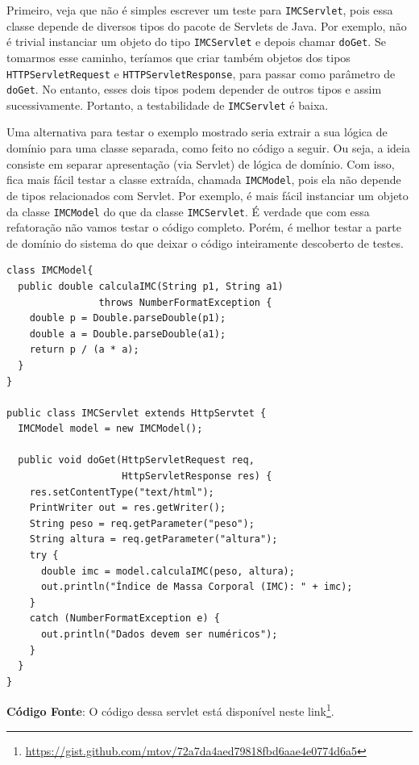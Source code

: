 \documentclass[
  11pt,
  twoside]{book}
\newcommand{\passthrough}[1]{#1}
\DeclareRobustCommand{\href}[2]{#2\footnote{\url{#1}}}
\begin{document}
Primeiro, veja que não é simples escrever um teste para
\passthrough{\lstinline!IMCServlet!}, pois essa classe depende de
diversos tipos do pacote de Servlets de Java. Por exemplo, não é trivial
instanciar um objeto do tipo \passthrough{\lstinline!IMCServlet!} e
depois chamar \passthrough{\lstinline!doGet!}. Se tomarmos esse caminho,
teríamos que criar também objetos dos tipos
\passthrough{\lstinline!HTTPServletRequest!} e
\passthrough{\lstinline!HTTPServletResponse!}, para passar como
parâmetro de \passthrough{\lstinline!doGet!}. No entanto, esses dois
tipos podem depender de outros tipos e assim sucessivamente. Portanto, a
testabilidade de \passthrough{\lstinline!IMCServlet!} é baixa.

Uma alternativa para testar o exemplo mostrado seria extrair a sua
lógica de domínio para uma classe separada, como feito no código a
seguir. Ou seja, a ideia consiste em separar apresentação (via Servlet)
de lógica de domínio. Com isso, fica mais fácil testar a classe
extraída, chamada \passthrough{\lstinline!IMCModel!}, pois ela não
depende de tipos relacionados com Servlet. Por exemplo, é mais fácil
instanciar um objeto da classe \passthrough{\lstinline!IMCModel!} do que
da classe \passthrough{\lstinline!IMCServlet!}. É verdade que com essa
refatoração não vamos testar o código completo. Porém, é melhor testar a
parte de domínio do sistema do que deixar o código inteiramente
descoberto de testes.

\begin{lstlisting}
class IMCModel{
  public double calculaIMC(String p1, String a1) 
                throws NumberFormatException {
    double p = Double.parseDouble(p1);
    double a = Double.parseDouble(a1);
    return p / (a * a);
  }
}

public class IMCServlet extends HttpServtet {
  IMCModel model = new IMCModel();

  public void doGet(HttpServletRequest req, 
                    HttpServletResponse res) {
    res.setContentType("text/html");
    PrintWriter out = res.getWriter();
    String peso = req.getParameter("peso");
    String altura = req.getParameter("altura");
    try {
      double imc = model.calculaIMC(peso, altura);
      out.println("Índice de Massa Corporal (IMC): " + imc);
    }
    catch (NumberFormatException e) {
      out.println("Dados devem ser numéricos");
    }
  }
}  
\end{lstlisting}

\textbf{Código Fonte}: O código dessa servlet está disponível neste
\href{https://gist.github.com/mtov/72a7da4aed79818fbd6aae4e0774d6a5}{link}.
\end{document}
